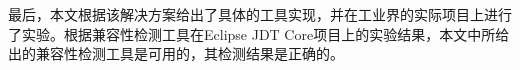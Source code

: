 最后，本文根据该解决方案给出了具体的工具实现，并在工业界的实际项目上进行了实验。根据兼容性检测工具在Eclipse JDT Core项目上的实验结果，本文中所给出的兼容性检测工具是可用的，其检测结果是正确的。




%		
%		

